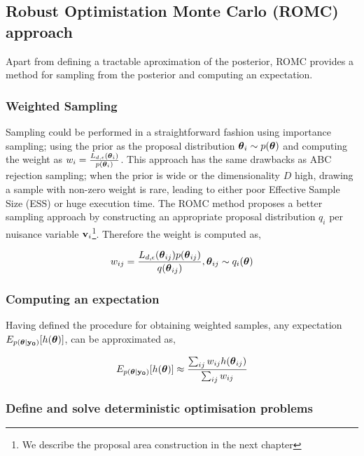\subsection{Robust Optimistation Monte Carlo (ROMC) approach}
\label{sec:ROMC}

Apart from defining a tractable aproximation of the posterior, ROMC
provides a method for sampling from the posterior and computing an expectation.

\subsubsection*{Weighted Sampling}

Sampling could be performed in a straightforward fashion using
importance sampling; using the prior as the proposal distribution
$\boldsymbol{\theta}_i \sim p(\boldsymbol{\theta})$ and computing the weight as
$w_i = \frac{L_{d,\epsilon}(\boldsymbol{\theta}_i)}{p(\boldsymbol{\theta}_i)}$. This approach
has the same drawbacks as ABC rejection sampling; when the prior is
wide or the dimensionality $D$ high, drawing a sample with non-zero
weight is rare, leading to either poor Effective Sample Size (ESS) or
huge execution time. The ROMC method proposes a better sampling
approach by constructing an appropriate proposal distribution $q_i$
per nuisance variable $\mathbf{v}_i$\footnote{We describe the proposal area
  construction in the next chapter}. Therefore the weight is computed
as,

\begin{equation} \label{eq:sampling}
  w_{ij} = \frac{L_{d,\epsilon}(\boldsymbol{\theta}_{ij}) p(\boldsymbol{\theta}_{ij})}{q(\boldsymbol{\theta}_{ij})}, \boldsymbol{\theta}_{ij} \sim q_i(\boldsymbol{\theta})
\end{equation}


\subsubsection*{Computing an expectation}

Having defined the procedure for obtaining weighted samples, any expectation $E_{p(\boldsymbol{\theta}|\mathbf{y_0})}[h(\boldsymbol{\theta})]$, can be approximated as,

\begin{equation} \label{eq:expectation}
  E_{p(\boldsymbol{\theta}|\mathbf{y_0})}[h(\boldsymbol{\theta})] \approx \frac{\sum_{ij} w_{ij} h(\boldsymbol{\theta}_{ij})}{\sum_{ij} w_{ij}}
\end{equation}

 
\subsubsection{Define and solve deterministic optimisation problems}

